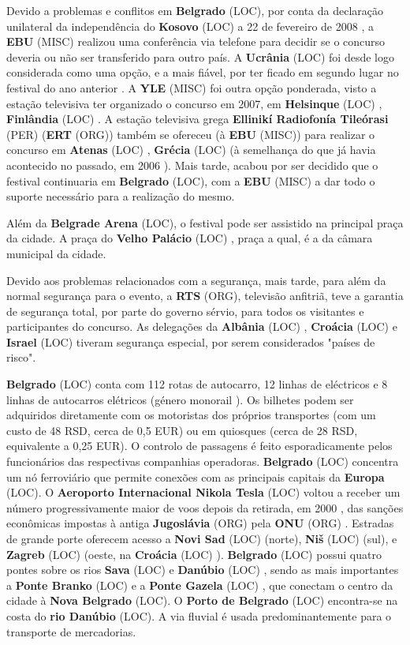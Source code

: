 \documentclass[12pt,a4paper]{article}
\begin{document}
Devido a problemas e conflitos em \textbf{Belgrado} (LOC), por conta da declaração unilateral da independência do \textbf{Kosovo} (LOC) a 22 de fevereiro de 2008 , a \textbf{EBU} (MISC) realizou uma conferência via telefone para decidir se o concurso deveria ou não ser transferido para outro país. A \textbf{Ucrânia} (LOC) foi desde logo considerada como uma opção, e a mais fiável, por ter ficado em segundo lugar no festival do ano anterior . A \textbf{YLE} (MISC) foi outra opção ponderada, visto a estação televisiva ter organizado o concurso em 2007, em \textbf{Helsinque} (LOC) , \textbf{Finlândia} (LOC) . A estação televisiva grega \textbf{Ellinikí Radiofonía Tileórasi} (PER) (\textbf{ERT} (ORG)) também se ofereceu (à \textbf{EBU} (MISC)) para realizar o concurso em \textbf{Atenas} (LOC) , \textbf{Grécia} (LOC) (à semelhança do que já havia acontecido no passado, em 2006 ). Mais tarde, acabou por ser decidido que o festival continuaria em \textbf{Belgrado} (LOC), com a \textbf{EBU} (MISC) a dar todo o suporte necessário para a realização do mesmo.

Além da \textbf{Belgrade Arena} (LOC), o festival pode ser assistido na principal praça da cidade. A praça do \textbf{Velho Palácio} (LOC) , praça a qual, é a da câmara municipal da cidade.

Devido aos problemas relacionados com a segurança, mais tarde, para além da normal segurança para o evento, a \textbf{RTS} (ORG), televisão anfitriã, teve a garantia de segurança total, por parte do governo sérvio, para todos os visitantes e participantes do concurso. As delegações da \textbf{Albânia} (LOC) , \textbf{Croácia} (LOC) e \textbf{Israel} (LOC) tiveram segurança especial, por serem considerados "países de risco".

\textbf{Belgrado} (LOC) conta com 112 rotas de autocarro, 12 linhas de eléctricos e 8 linhas de autocarros elétricos (género monorail ). Os bilhetes podem ser adquiridos diretamente com os motoristas dos próprios transportes (com um custo de 48 RSD, cerca de 0,5 EUR) ou em quiosques (cerca de 28 RSD, equivalente a 0,25 EUR). O controlo de passagens é feito esporadicamente pelos funcionários das respectivas companhias operadoras. \textbf{Belgrado} (LOC) concentra um nó ferroviário que permite conexões com as principais capitais da \textbf{Europa} (LOC). O \textbf{Aeroporto Internacional Nikola Tesla} (LOC) voltou a receber um número progressivamente maior de voos depois da retirada, em 2000 , das sanções econômicas impostas à antiga \textbf{Jugoslávia} (ORG) pela \textbf{ONU} (ORG) . Estradas de grande porte oferecem acesso a \textbf{Novi Sad} (LOC) (norte), \textbf{Niš} (LOC) (sul), e \textbf{Zagreb} (LOC) (oeste, na \textbf{Croácia} (LOC) ). \textbf{Belgrado} (LOC) possui quatro pontes sobre os rios \textbf{Sava} (LOC) e \textbf{Danúbio} (LOC) , sendo as mais importantes a \textbf{Ponte Branko} (LOC) e a \textbf{Ponte Gazela} (LOC) , que conectam o centro da cidade à \textbf{Nova Belgrado} (LOC). O \textbf{Porto de Belgrado} (LOC) encontra-se na costa do \textbf{rio Danúbio} (LOC). A via fluvial é usada predominantemente para o transporte de mercadorias.
\end{document}
